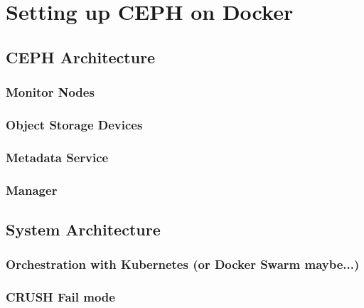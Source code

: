 \documentclass[titlepage, a4paper, 11pt]{scrartcl}
\begin{document}


    \section{Setting up CEPH on Docker}

        \subsection{CEPH Architecture}
            
            \subsubsection{Monitor Nodes}


            \subsubsection{Object Storage Devices}


            \subsubsection{Metadata Service}

            \subsubsection{Manager}    

        \subsection{System Architecture}


            \subsubsection{Orchestration with Kubernetes (or Docker Swarm maybe...)}

            \subsubsection{CRUSH Fail mode}
\end{document}

